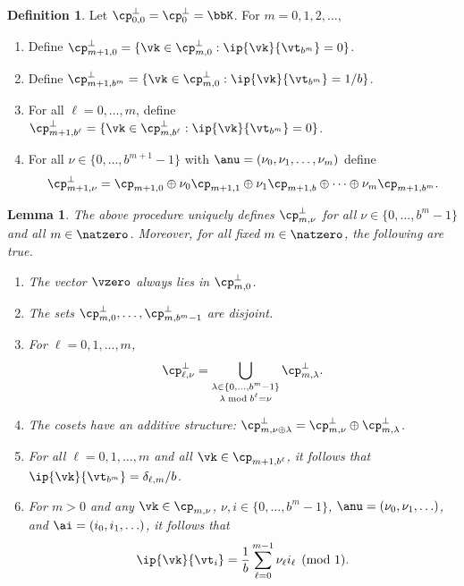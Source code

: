 \documentclass[]{elsarticle}
\newtheorem{lem}{Lemma}
\theoremstyle{definition}
\newtheorem{defin}{Definition}
\begin{document}
\begin{defin} \label{noodefalgo} Let $\cp_{0,0}^{\perp}=\cp_{0}^{\perp}=\bbK$.  For $m=0, 1, 2, \ldots$, 
\begin{enumerate}
\renewcommand{\labelenumi}{\alph{enumi})}
\item Define $\cp_{m+1,0}^{\perp}=\{\vk \in \cp_{m,0}^{\perp} : \ip{\vk}{\vt_{b^{m}}}=0\}$.
\item Define $\cp_{m+1,b^{m}}^{\perp}=\{\vk \in \cp_{m,0}^{\perp} : \ip{\vk}{\vt_{b^{m}}}=1/b\}$.  
\item For all $\ell=0, \ldots, m$, define $\cp_{m+1,b^{\ell}}^{\perp}=\{\vk \in \cp_{m,b^{\ell}}^{\perp} : \ip{\vk}{\vt_{b^{m}}}=0\}$.
\item For all $\nu \in \{0, \ldots, b^{m+1}-1\}$ with $\anu=(\nu_0, \nu_1, \ldots, \nu_m)$ define 
\[
\cp_{m+1,\nu}^{\perp}= \cp_{m+1,0} \oplus  \nu_0 \cp_{m+1,1} \oplus \nu_1 \cp_{m+1,b} \oplus \cdots \oplus \nu_m \cp_{m+1,b^m}.
\]
\end{enumerate}
\end{defin}

\begin{lem} \label{cosetlem} The above procedure uniquely defines $\cp_{m,\nu}^{\perp}$  for all $\nu \in \{0, \ldots, b^m-1\}$ and all $m \in \natzero$.  Moreover, for all fixed $m \in \natzero$, the following are true.
\begin{enumerate}
\renewcommand{\labelenumi}{\alph{enumi})}

\item The vector $\vzero$ always lies in $\cp_{m,0}^{\perp}$.

\item The sets $\cp_{m,0}^{\perp}, \ldots, \cp_{m,b^m-1}^{\perp}$ are disjoint. 

\item For $\ell=0, 1, \ldots, m$,
\[
\cp_{\ell, \nu}^{\perp} = \bigcup_{\substack{\lambda \in \{0, \ldots, b^{m}-1\} \\ \lambda \bmod b^\ell = \nu}} \cp_{m,\lambda}^{\perp}.
\]

\item The cosets have an additive structure: $\cp_{m,\nu \oplus \lambda}^{\perp} = \cp_{m,\nu}^{\perp} \oplus \cp_{m,\lambda}^{\perp}$.

\item For all $\ell = 0, 1, \ldots, m$ and all $\vk \in \cp_{m+1,b^\ell}$, it follows that $\ip{\vk}{\vt_{b^{m}}} =  \delta_{\ell,m}/b$.

\item For $m>0$ and any $\vk \in \cp_{m,\nu}$, $\nu, i \in \{0, \ldots, b^m-1\}$,  $\anu=(\nu_0, \nu_1, \ldots)$, and $\ai=(i_0, i_1, \ldots)$, it follows that 
\begin{equation} \label{nuwisum}
\ip{\vk}{\vt_i} = \frac 1 b \sum_{\ell=0}^{m-1} \nu_\ell i_{\ell} \pmod 1.
\end{equation}

\end{enumerate}
\end{lem}
\end{document}
